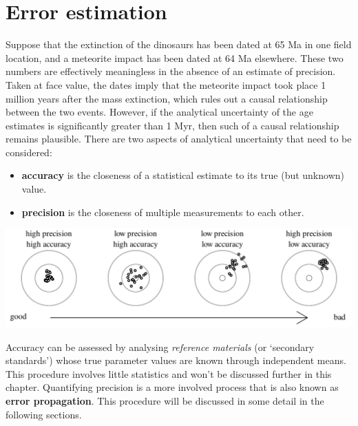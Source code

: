 \chapter{Error estimation}
\label{ch:errorprop}

Suppose that the extinction of the dinosaurs has been dated at 65 Ma
in one field location, and a meteorite impact has been dated at 64 Ma
elsewhere.  These two numbers are effectively meaningless in the
absence of an estimate of precision. Taken at face value, the dates
imply that the meteorite impact took place 1 million years after the
mass extinction, which rules out a causal relationship between the two
events. However, if the analytical uncertainty of the age estimates is
significantly greater than 1 Myr, then such of a causal relationship
remains plausible. There are two aspects of analytical uncertainty that
need to be considered:

\begin{itemize}
  \item{\bf accuracy} is the closeness of a statistical estimate to
    its true (but unknown) value.
  \item{\bf precision} is the closeness of multiple measurements to
    each other.
\end{itemize}

\noindent\includegraphics[width=\textwidth]{../figures/accuracyvsprecision.pdf}
\begingroup {}
\label{fig:darts}
\endgroup

Accuracy can be assessed by analysing \emph{reference materials} (or
`secondary standards') whose true parameter values are known through
independent means. This procedure involves little statistics and won't
be discussed further in this chapter. Quantifying precision is a more
involved process that is also known as \textbf{error
  propagation}. This procedure will be discussed in some detail in the
following sections.

